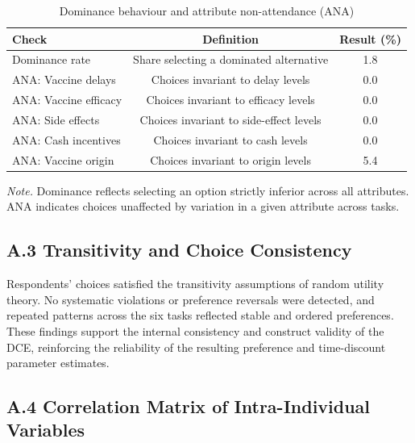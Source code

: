 \begin{table}[H]
    \centering
    \caption{Dominance behaviour and attribute non-attendance (ANA)}
    \label{tab:validity}
    \begin{tabular}{lcc}
        \toprule
        \textbf{Check} & \textbf{Definition} & \textbf{Result (\%)} \\
        \midrule
        Dominance rate &
        Share selecting a dominated alternative &
        1.8 \\
        ANA: Vaccine delays &
        Choices invariant to delay levels &
        0.0 \\
        ANA: Vaccine efficacy &
        Choices invariant to efficacy levels &
        0.0 \\
        ANA: Side effects &
        Choices invariant to side-effect levels &
        0.0 \\
        ANA: Cash incentives &
        Choices invariant to cash levels &
        0.0 \\
        ANA: Vaccine origin &
        Choices invariant to origin levels &
        5.4 \\
        \bottomrule
    \end{tabular}

    \vspace{4pt}
    \footnotesize
    \textit{Note.} Dominance reflects selecting an option strictly inferior across all attributes. ANA 
    indicates choices unaffected by variation in a given attribute across tasks.
\end{table}

\subsection*{A.3 Transitivity and Choice Consistency}

Respondents’ choices satisfied the transitivity assumptions of random utility theory. No 
systematic violations or preference reversals were detected, and repeated patterns across the 
six tasks reflected stable and ordered preferences. These findings support the internal 
consistency and construct validity of the DCE, reinforcing the reliability of the resulting 
preference and time-discount parameter estimates.

\subsection*{A.4 Correlation Matrix of Intra-Individual Variables}

